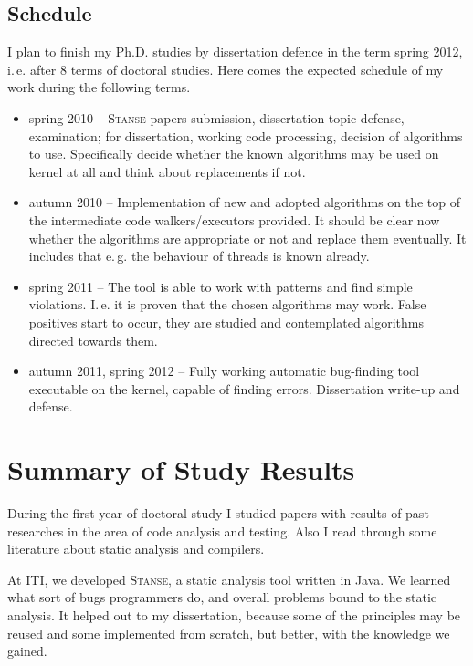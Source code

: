 \documentclass[11pt,a4paper]{article}
\newcommand{\stan}{\textsc{Stanse}\xspace}
\begin{document}
\subsection{Schedule}
I plan to finish my Ph.D. studies by dissertation defence in the term spring
2012, i.\,e. after 8 terms of doctoral studies. Here comes the expected schedule
of my work during the following terms.
\begin{itemize}
\item spring 2010 -- \stan papers submission, dissertation topic defense,
examination; for dissertation, working code processing, decision of algorithms
to use. Specifically decide whether the known algorithms may be used on kernel
at all and think about replacements if not.
\item autumn 2010 -- Implementation of new and adopted algorithms on the top of
the intermediate code walkers/executors provided. It should be clear now
whether the algorithms are appropriate or not and replace them eventually.
It includes that e.\,g. the behaviour of threads is known already.
\item spring 2011 -- The tool is able to work with patterns and find simple
violations. I.\,e. it is proven that the chosen algorithms may work. False
positives start to occur, they are studied and contemplated algorithms
directed towards them.
\item autumn 2011, spring 2012 -- Fully working automatic bug-finding tool
executable on the kernel, capable of finding errors. Dissertation write-up
and defense.
\end{itemize}

\newpage





\newpage

\section{Summary of Study Results}
\label{results}
During the first year of doctoral study I studied papers with results of past
researches in the area of code analysis and testing. Also I read through some
literature about static analysis and compilers.

At ITI, we developed \stan, a static analysis tool written in Java. We
learned what sort of bugs programmers do, and overall problems bound to
the static analysis. It helped out to my dissertation, because some of the
principles may be reused and some implemented from scratch, but better, with
the knowledge we gained.
\end{document}
